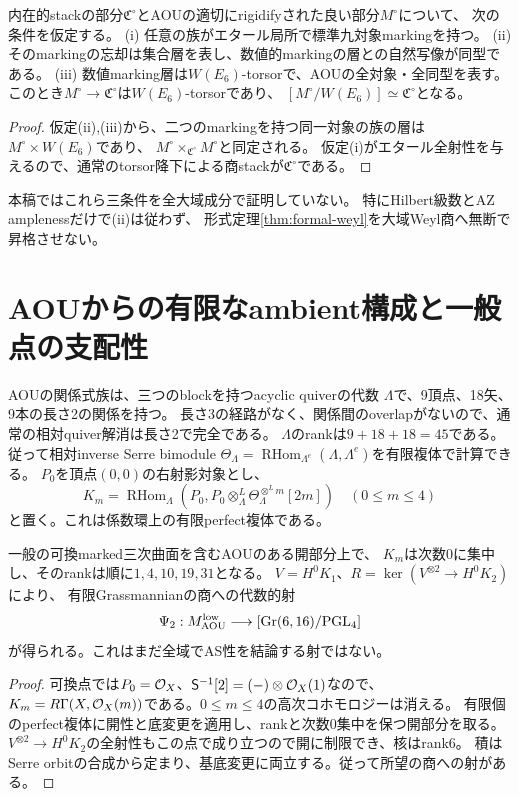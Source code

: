 \begin{proposition}[大域商を証明するための十分条件]\label{prop:global-weyl-criterion}
内在的stackの部分$\mathfrak C^\circ$とAOUの適切にrigidifyされた良い部分$M^\circ$について、
次の条件を仮定する。
(i) 任意の族がエタール局所で標準九対象markingを持つ。
(ii) そのmarkingの忘却は集合層を表し、数値的markingの層との自然写像が同型である。
(iii) 数値marking層は$W(E_6)$-torsorで、AOUの全対象・全同型を表す。
このとき$M^\circ\to\mathfrak C^\circ$は$W(E_6)$-torsorであり、
$[M^\circ/W(E_6)]\simeq\mathfrak C^\circ$となる。
\end{proposition}
\begin{proof}
仮定(ii),(iii)から、二つのmarkingを持つ同一対象の族の層は
$M^\circ\times W(E_6)$であり、
$M^\circ\times_{\mathfrak C^\circ}M^\circ$と同定される。
仮定(i)がエタール全射性を与えるので、通常のtorsor降下による商stackが$\mathfrak C^\circ$である。
\end{proof}
本稿ではこれら三条件を全大域成分で証明していない。
特にHilbert級数とAZ amplenessだけで(ii)は従わず、
形式定理\ref{thm:formal-weyl}を大域Weyl商へ無断で昇格させない。

\section{AOUからの有限なambient構成と一般点の支配性}\label{sec:aou-ambient}
AOUの関係式族は、三つのblockを持つacyclic quiverの代数
$\Lambda$で、9頂点、18矢、9本の長さ2の関係を持つ。
長さ3の経路がなく、関係間のoverlapがないので、通常の相対quiver解消は長さ2で完全である。
$\Lambda$のrankは$9+18+18=45$である。
従って相対inverse Serre bimodule
$\Theta_\Lambda=\operatorname{RHom}_{\Lambda^e}(\Lambda,\Lambda^e)$を有限複体で計算できる。
$P_0$を頂点$(0,0)$の右射影対象とし、
\begin{equation}\label{eq:finite-serre}
 K_m=\operatorname{RHom}_\Lambda
       (P_0,P_0\mathbin{\otimes^L_\Lambda}\Theta_\Lambda^{\otimes^L m}[2m])
       \quad(0\le m\le4)
\end{equation}
と置く。これは係数環上の有限perfect複体である。

\begin{proposition}[低次数からの代数的候補射]\label{prop:aou-candidate}
一般の可換marked三次曲面を含むAOUのある開部分上で、
$K_m$は次数0に集中し、そのrankは順に$1,4,10,19,31$となる。
$V=H^0K_1$、$R=\ker(V^{\otimes2}\to H^0K_2)$により、
有限Grassmannianの商への代数的射
\[
 \Psi_2:M_{\rm AOU}^{\rm low}\longrightarrow
 [\operatorname{Gr}(6,16)/\mathrm{PGL}_4]
\]
が得られる。これはまだ全域でAS性を結論する射ではない。
\end{proposition}
\begin{proof}
可換点では$P_0=\mathcal O_X$、$\mathsf S^{-1}[2]=(-)\otimes\mathcal O_X(1)$なので、
$K_m=R\Gamma(X,\mathcal O_X(m))$である。$0\le m\le4$の高次コホモロジーは消える。
有限個のperfect複体に開性と底変更を適用し、rankと次数0集中を保つ開部分を取る。
$V^{\otimes2}\to H^0K_2$の全射性もこの点で成り立つので開に制限でき、核はrank6。
積はSerre orbitの合成から定まり、基底変更に両立する。従って所望の商への射がある。
\end{proof}

